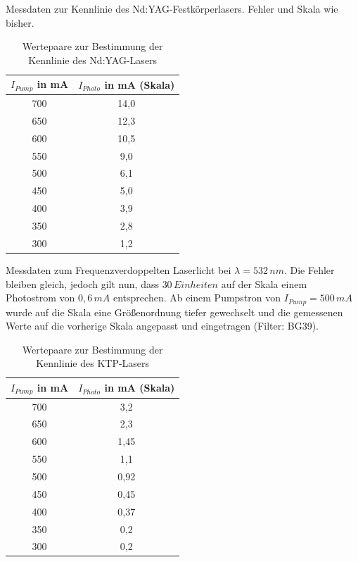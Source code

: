 \documentclass[twoside,colorback,accentcolor=tud4c,11pt]{tudreport}
\begin{document}
Messdaten zur Kennlinie des Nd:YAG-Festkörperlasers. Fehler und Skala wie bisher.
\begin{table}[H]
\renewcommand*{\arraystretch}{1.2}
\centering
\begin{tabular}{|c|c|}
\hline 
$I_{Pump}$ in mA & $I_{Photo}$ in mA (Skala)\\
\hline 
700 & 14,0  \\ 
\hline 
650 & 12,3  \\ 
\hline 
600 & 10,5  \\ 
\hline 
550 & 9,0  \\ 
\hline 
500 & 6,1  \\ 
\hline
450 & 5,0 \\ 
\hline
400 & 3,9 \\ 
\hline
350 & 2,8 \\ 
\hline
300 & 1,2 \\ 
\hline
\end{tabular} 
\caption{Wertepaare zur Bestimmung der Kennlinie des Nd:YAG-Lasers}\label{kennND}
\end{table}
\newpage
Messdaten zum Frequenzverdoppelten Laserlicht bei $\lambda =532\,\si{nm}$. Die Fehler bleiben gleich, jedoch gilt nun, dass $30\,\si{Einheiten}$ auf der Skala einem Photostrom von $0,6\,\si{mA}$ entsprechen.
Ab einem Pumpstron von $I_{Pump}=500\,\si{mA}$ wurde auf die Skala eine Größenordnung tiefer gewechselt und die gemessenen Werte auf die vorherige Skala angepasst und eingetragen (Filter: BG39).
\begin{table}[H]
\renewcommand*{\arraystretch}{1.2}
\centering
\begin{tabular}{|c|c|}
\hline 
$I_{Pump}$ in mA & $I_{Photo}$ in mA (Skala)\\
\hline 
700 & 3,2  \\ 
\hline 
650 & 2,3  \\ 
\hline 
600 & 1,45  \\ 
\hline 
550 & 1,1  \\ 
\hline 
500 & 0,92  \\ 
\hline
450 & 0,45 \\ 
\hline
400 & 0,37 \\ 
\hline
350 & 0,2 \\ 
\hline
300 & 0,2 \\ 
\hline
\end{tabular} 
\caption{Wertepaare zur Bestimmung der Kennlinie des KTP-Lasers}\label{kennktp}
\end{table}
\end{document}
